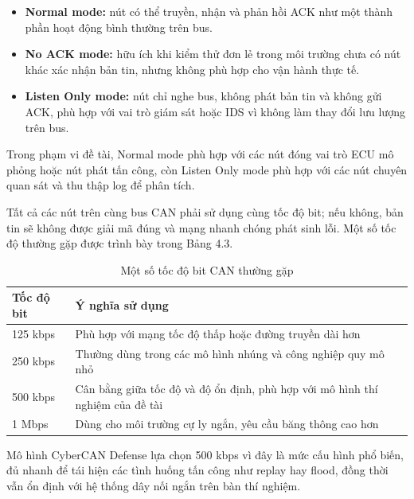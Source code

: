 
\begin{itemize}
    \item \textbf{Normal mode:} nút có thể truyền, nhận và phản hồi ACK như một thành
    phần hoạt động bình thường trên bus.
    \item \textbf{No ACK mode:} hữu ích khi kiểm thử đơn lẻ trong môi trường chưa có nút
    khác xác nhận bản tin, nhưng không phù hợp cho vận hành thực tế.
    \item \textbf{Listen Only mode:} nút chỉ nghe bus, không phát bản tin và không gửi ACK,
    phù hợp với vai trò giám sát hoặc IDS vì không làm thay đổi lưu lượng trên bus.
\end{itemize}

Trong phạm vi đề tài, Normal mode phù hợp với các nút đóng vai trò ECU mô phỏng hoặc
nút phát tấn công, còn Listen Only mode phù hợp với các nút chuyên quan sát và thu thập
log để phân tích.


Tất cả các nút trên cùng bus CAN phải sử dụng cùng tốc độ bit; nếu không, bản tin sẽ
không được giải mã đúng và mạng nhanh chóng phát sinh lỗi. Một số tốc độ thường gặp
được trình bày trong Bảng 4.3.

\begin{table}[H]
\centering
\begin{tabular}{|p{3cm}|p{9.6cm}|}
\hline
\textbf{Tốc độ bit} & \textbf{Ý nghĩa sử dụng} \\ \hline
125 kbps & Phù hợp với mạng tốc độ thấp hoặc đường truyền dài hơn \\ \hline
250 kbps & Thường dùng trong các mô hình nhúng và công nghiệp quy mô nhỏ \\ \hline
\rowcolor{red!20}
500 kbps & Cân bằng giữa tốc độ và độ ổn định, phù hợp với mô hình thí nghiệm của đề tài \\ \hline
1 Mbps & Dùng cho môi trường cự ly ngắn, yêu cầu băng thông cao hơn \\ \hline
\end{tabular}
\caption{Một số tốc độ bit CAN thường gặp}
\end{table}

Mô hình CyberCAN Defense lựa chọn 500 kbps vì đây là mức cấu hình phổ biến, đủ nhanh
để tái hiện các tình huống tấn công như replay hay flood, đồng thời vẫn ổn định với hệ
thống dây nối ngắn trên bàn thí nghiệm.


